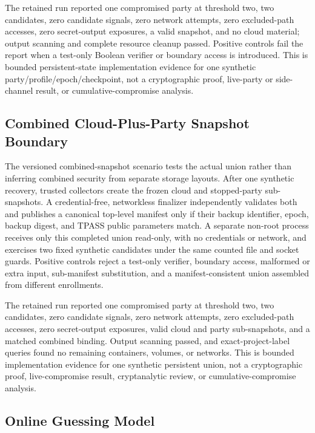 \documentclass[sigconf,anonymous]{acmart}
\begin{document}
The retained run reported one compromised party at threshold two, two candidates, zero candidate signals, zero network attempts, zero excluded-path accesses, zero secret-output exposures, a valid snapshot, and no cloud material; output scanning and complete resource cleanup passed. Positive controls fail the report when a test-only Boolean verifier or boundary access is introduced. This is bounded persistent-state implementation evidence for one synthetic party/profile/epoch/checkpoint, not a cryptographic proof, live-party or side-channel result, or cumulative-compromise analysis.

\subsection{Combined Cloud-Plus-Party Snapshot Boundary}
\label{subsec:combined-snapshot-eval}

The versioned combined-snapshot scenario tests the actual union rather than
inferring combined security from separate storage layouts. After one synthetic
recovery, trusted collectors create the frozen cloud and stopped-party
sub-snapshots. A credential-free, networkless finalizer independently validates
both and publishes a canonical top-level manifest only if their backup
identifier, epoch, backup digest, and TPASS public parameters match. A separate
non-root process receives only this completed union read-only, with no
credentials or network, and exercises two fixed synthetic candidates under the
same counted file and socket guards. Positive controls reject a test-only
verifier, boundary access, malformed or extra input, sub-manifest substitution,
and a manifest-consistent union assembled from different enrollments.

The retained run reported one compromised party at threshold two, two candidates, zero candidate signals, zero network attempts, zero excluded-path accesses, zero secret-output exposures, valid cloud and party sub-snapshots, and a matched combined binding. Output scanning passed, and exact-project-label queries found no remaining containers, volumes, or networks. This is bounded implementation evidence for one synthetic persistent union, not a cryptographic proof, live-compromise result, cryptanalytic review, or cumulative-compromise analysis.

\subsection{Online Guessing Model}
\label{subsec:guessing-resistance}
\end{document}
